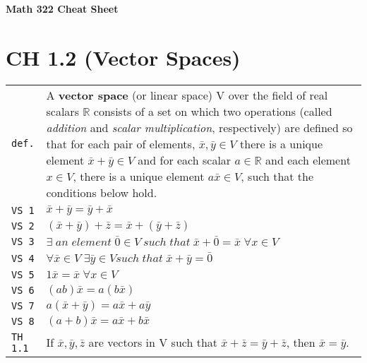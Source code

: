 \documentclass[10pt,landscape]{article}
\begin{document}
\raggedright
\footnotesize
\begin{multicols}{3}


\setlength{\premulticols}{0pt}
\setlength{\postmulticols}{0pt}
\setlength{\multicolsep}{0pt}
\setlength{\columnsep}{0pt}

\begin{center}
     \Large{\textbf{Math 322 Cheat Sheet}} \\
\end{center}

\section{CH 1.2 (Vector Spaces)}
\newlength{\MyLen}
\begin{tabular}{@{}p{\the\MyLen}%
                @{}p{\linewidth-\the\MyLen}@{}} %
\verb!def.!   & A \textbf{vector space} (or linear space) V over the field of real scalars $\mathbb{R}$ consists of a set on which two operations (called \textit{addition} and \textit {scalar multiplication}, respectively) 
		     are defined so that for each pair of elements, $\bar x , \bar y \! \in V$ there is a unique element $\bar x + \bar y \! \in V$ and for each scalar $a\!\in\!\mathbb{R}$ and each element
		     $x\!\in\! V$, there is a unique element $a\bar x \! \in\! V$, such that the conditions below hold.\\
\verb!VS 1!  & $\bar x + \bar y = \bar y + \bar x$\\
\verb!VS 2!  & $(\bar x + \bar y) + \bar z = \bar x + (\bar y + \bar z)$ \\
\verb!VS 3!  & $\exists\; an\; element\; \bar 0\! \in \!V\: such\; that\; \bar x + \bar 0 = \bar x \; \forall x\! \in\! V$\\
\verb!VS 4!  & $\forall \bar x\! \in\! V \; \exists \bar y \!\in\! V such\; that\; \bar x + \bar y = \bar 0$ \\
\verb!VS 5!  & $1\bar x = \bar x \; \forall x\! \in\! V$\\
\verb!VS 6!  & $(ab)\bar x = a(b\bar x)$\\
\verb!VS 7!  & $a(\bar x + \bar y) = a\bar x + a\bar y$\\
\verb!VS 8!  & $(a + b)\bar x = a\bar x + b\bar x$\\
\verb!TH 1.1! & If $\bar x , \bar y , \bar z$ are vectors in V such that $\bar x + \bar z = \bar y + \bar z$, then $\bar x = \bar y$.\\

\end{tabular}
\end{multicols}
\end{document}
